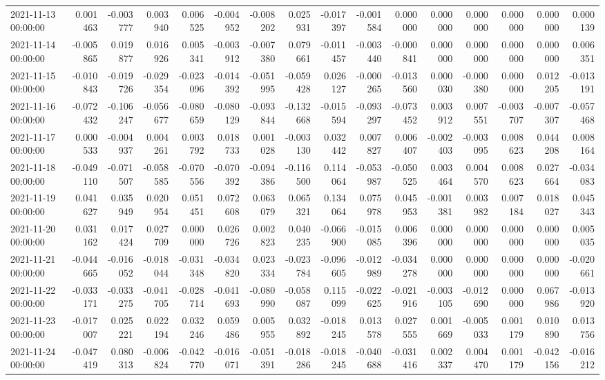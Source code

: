 \begin{tabular}{lrrrrrrrrrrrrrrr}
2021-11-13 00:00:00 & 0.001463 & -0.003777 & 0.003940 & 0.006525 & -0.004952 & -0.008202 & 0.025931 & -0.017397 & -0.001584 & 0.000000 & 0.000000 & 0.000000 & 0.000000 & 0.000000 & 0.000139 \\
2021-11-14 00:00:00 & -0.005865 & 0.019877 & 0.016926 & 0.005341 & -0.003912 & -0.007380 & 0.079661 & -0.011457 & -0.003440 & -0.000841 & 0.000000 & 0.000000 & 0.000000 & 0.000000 & 0.006351 \\
2021-11-15 00:00:00 & -0.010843 & -0.019726 & -0.029354 & -0.023096 & -0.014392 & -0.051995 & -0.059428 & 0.026127 & -0.000265 & -0.013560 & 0.000030 & -0.000380 & 0.000000 & 0.012205 & -0.013191 \\
2021-11-16 00:00:00 & -0.072432 & -0.106247 & -0.056677 & -0.080659 & -0.080129 & -0.093844 & -0.132668 & -0.015594 & -0.093297 & -0.073452 & 0.003912 & 0.007551 & -0.003707 & -0.007307 & -0.057468 \\
2021-11-17 00:00:00 & 0.000533 & -0.004937 & 0.004261 & 0.003792 & 0.018733 & 0.001028 & -0.003130 & 0.032442 & 0.007827 & 0.006407 & -0.002403 & -0.003095 & 0.008623 & 0.044208 & 0.008164 \\
2021-11-18 00:00:00 & -0.049110 & -0.071507 & -0.058585 & -0.070556 & -0.070392 & -0.094386 & -0.116500 & 0.114064 & -0.053987 & -0.050525 & 0.003464 & 0.004570 & 0.008623 & 0.027664 & -0.034083 \\
2021-11-19 00:00:00 & 0.041627 & 0.035949 & 0.020954 & 0.051451 & 0.072608 & 0.063079 & 0.065321 & 0.134064 & 0.075978 & 0.045953 & -0.001381 & 0.003982 & 0.007184 & 0.018027 & 0.045343 \\
2021-11-20 00:00:00 & 0.031162 & 0.017424 & 0.027709 & 0.000000 & 0.026726 & 0.002823 & 0.040235 & -0.066900 & -0.015085 & 0.006396 & 0.000000 & 0.000000 & 0.000000 & 0.000000 & 0.005035 \\
2021-11-21 00:00:00 & -0.044665 & -0.016052 & -0.018044 & -0.031348 & -0.034820 & 0.023334 & -0.023784 & -0.096605 & -0.012989 & -0.034278 & 0.000000 & 0.000000 & 0.000000 & 0.000000 & -0.020661 \\
2021-11-22 00:00:00 & -0.033171 & -0.033275 & -0.041705 & -0.028714 & -0.041693 & -0.080990 & -0.058087 & 0.115099 & -0.022625 & -0.021916 & -0.003105 & -0.012690 & 0.000000 & 0.067986 & -0.013920 \\
2021-11-23 00:00:00 & -0.017007 & 0.025221 & 0.022194 & 0.032246 & 0.059486 & 0.005955 & 0.032892 & -0.018245 & 0.013578 & 0.027555 & 0.001669 & -0.005033 & 0.001179 & 0.010890 & 0.013756 \\
2021-11-24 00:00:00 & -0.047419 & 0.080313 & -0.006824 & -0.042770 & -0.016071 & -0.051391 & -0.018286 & -0.018245 & -0.040688 & -0.031416 & 0.002337 & 0.004470 & 0.001179 & -0.042156 & -0.016212 \\

\end{tabular}
